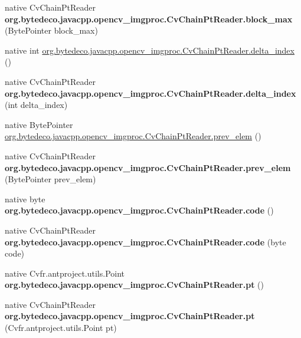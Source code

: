 \begin{DoxyCompactItemize}
native Cv\+Chain\+Pt\+Reader {\bfseries org.\+bytedeco.\+javacpp.\+opencv\+\_\+imgproc.\+Cv\+Chain\+Pt\+Reader.\+block\+\_\+max} (Byte\+Pointer block\+\_\+max)
\item 
native int \hyperlink{group__imgproc_gabc93e64b255df79172c001b0f8d238ce}{org.\+bytedeco.\+javacpp.\+opencv\+\_\+imgproc.\+Cv\+Chain\+Pt\+Reader.\+delta\+\_\+index} ()
\item 
\mbox{\label{group__imgproc_ga71c55b31361bcd75c7af369be39f6988}} 
native Cv\+Chain\+Pt\+Reader {\bfseries org.\+bytedeco.\+javacpp.\+opencv\+\_\+imgproc.\+Cv\+Chain\+Pt\+Reader.\+delta\+\_\+index} (int delta\+\_\+index)
\item 
native Byte\+Pointer \hyperlink{group__imgproc_ga291c319aa2e16f48fced0c98b62516d3}{org.\+bytedeco.\+javacpp.\+opencv\+\_\+imgproc.\+Cv\+Chain\+Pt\+Reader.\+prev\+\_\+elem} ()
\item 
\mbox{\label{group__imgproc_ga7e4ab07589eb6cae20e027bab919c799}} 
native Cv\+Chain\+Pt\+Reader {\bfseries org.\+bytedeco.\+javacpp.\+opencv\+\_\+imgproc.\+Cv\+Chain\+Pt\+Reader.\+prev\+\_\+elem} (Byte\+Pointer prev\+\_\+elem)
\item 
\mbox{\label{group__imgproc_ga5c6864157e6075094cda387402edf590}} 
native byte {\bfseries org.\+bytedeco.\+javacpp.\+opencv\+\_\+imgproc.\+Cv\+Chain\+Pt\+Reader.\+code} ()
\item 
\mbox{\label{group__imgproc_ga7f3e4dcaaa034bbcfb202dd6338624ad}} 
native Cv\+Chain\+Pt\+Reader {\bfseries org.\+bytedeco.\+javacpp.\+opencv\+\_\+imgproc.\+Cv\+Chain\+Pt\+Reader.\+code} (byte code)
\item 
\mbox{\label{group__imgproc_ga85ab808481e9301870d29cfd65cdefe3}} 
native Cv\+fr.antproject.utils.Point {\bfseries org.\+bytedeco.\+javacpp.\+opencv\+\_\+imgproc.\+Cv\+Chain\+Pt\+Reader.\+pt} ()
\item 
\mbox{\label{group__imgproc_ga5be3da47ec2c9af2d10163897e2bd6e8}} 
native Cv\+Chain\+Pt\+Reader {\bfseries org.\+bytedeco.\+javacpp.\+opencv\+\_\+imgproc.\+Cv\+Chain\+Pt\+Reader.\+pt} (Cv\+fr.antproject.utils.Point pt)
\item 
\mbox{\label{group__imgproc_ga3dafa6d6c0310bdd9124d401a07d80bb}} 

\end{DoxyCompactItemize}
